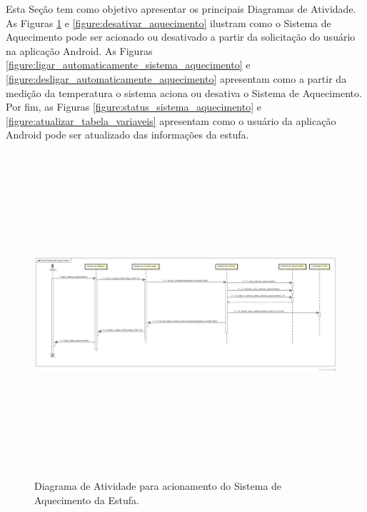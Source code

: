 \documentclass{report}
\begin{document}
   Esta Seção tem como objetivo apresentar os principais Diagramas de Atividade. As Figuras \ref{figure:ativar_sistema_aquecimento} e
   \ref{figure:desativar_aquecimento} ilustram como o Sistema de Aquecimento pode ser acionado ou desativado a partir da solicitação 
   do usuário na aplicação Android. As Figuras \ref{figure:ligar_automaticamente_sistema_aquecimento} e \ref{figure:desligar_automaticamente_aquecimento}
   apresentam como a partir da medição da temperatura o sistema aciona ou desativa o Sistema de Aquecimento. Por fim, as Figuras 
   \ref{figure:status_sistema_aquecimento} e \ref{figure:atualizar_tabela_variaveis} apresentam como o usuário da aplicação Android pode ser atualizado
   das informações da estufa. 
   
	\begin{landscape}
	     \begin{figure}[H]
	      \includegraphics[width=\linewidth, height = 12cm]{pictures/ativar_sistema_aquecimento.png}
	      \caption{Diagrama de Atividade para acionamento do Sistema de Aquecimento da Estufa.}
	      \label{figure:ativar_sistema_aquecimento}
	     \end{figure}
	\end{landscape}
   
\end{document}
